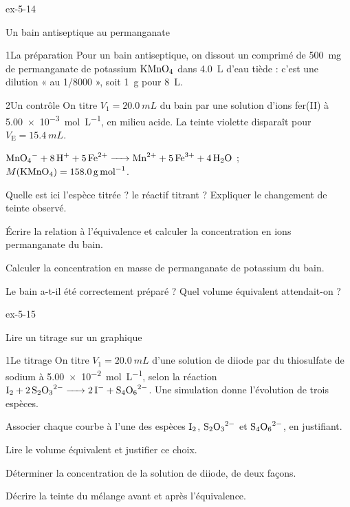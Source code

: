 \begin{blocLivre}{ex-5-14}
\begin{exercice}[3]{Un bain antiseptique au permanganate}
\begin{docu}{1}{La préparation}
Pour un bain antiseptique, on dissout un comprimé de \qty{500}{mg} de permanganate de potassium $\ce{KMnO4}$ dans \qty{4,0}{L}
d'eau tiède : c'est une dilution « au 1/8000 », soit \qty{1}{g} pour \qty{8}{L}.
\end{docu}
\begin{docu}{2}{Un contrôle}
On titre $V_1=\qty{20,0}{mL}$ du bain par une solution d'ions fer(II) à \qty{5,00e-3}{mol.L^{-1}}, en milieu acide. La teinte violette
disparaît pour $V_\mathrm{E}=\qty{15,4}{mL}$.
\end{docu}
\begin{donnees}
$\ce{MnO4- + 8H+ + 5Fe^{2+} -> Mn^{2+} + 5Fe^{3+} + 4H2O}$ ; $M(\ce{KMnO4})=\qty{158,0}{g.mol^{-1}}$.
\end{donnees}
\begin{questions}
\item Quelle est ici l'espèce titrée ? le réactif titrant ? Expliquer le changement de teinte observé.
\item Écrire la relation à l'équivalence et calculer la concentration en ions permanganate du bain.
\item Calculer la concentration en masse de permanganate de potassium du bain.
\item \initiative Le bain a-t-il été correctement préparé ? Quel volume équivalent attendait-on ?
\end{questions}
\end{exercice}
\end{blocLivre}
\begin{blocLivre}{ex-5-15}
\begin{exercice}[3]{Lire un titrage sur un graphique}
\begin{docu}{1}{Le titrage}
On titre $V_1=\qty{20,0}{mL}$ d'une solution de diiode par du thiosulfate de sodium à \qty{5,00e-2}{mol.L^{-1}}, selon la réaction
$\ce{I2 + 2S2O3^{2-} -> 2I- + S4O6^{2-}}$. Une simulation donne l'évolution de trois espèces.
\end{docu}
\begin{questions}
\item Associer chaque courbe à l'une des espèces $\ce{I2}$, $\ce{S2O3^{2-}}$ et $\ce{S4O6^{2-}}$, en justifiant.
\item Lire le volume équivalent et justifier ce choix.
\item \initiative Déterminer la concentration de la solution de diiode, de deux façons.
\item Décrire la teinte du mélange avant et après l'équivalence.
\end{questions}
\end{exercice}
\end{blocLivre}
